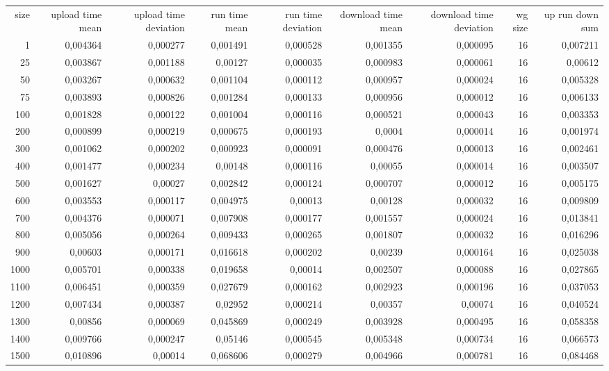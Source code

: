 \begin{tabular}{r r r r r r r r r}
size & upload time mean  & upload time deviation & run time mean & run time deviation & download time mean & download time deviation & wg size & up run down sum \\
1 & 0,004364 & 0,000277 & 0,001491 & 0,000528 & 0,001355 & 0,000095 & 16 & 0,007211 \\
25 & 0,003867 & 0,001188 & 0,00127 & 0,000035 & 0,000983 & 0,000061 & 16 & 0,00612 \\
50 & 0,003267 & 0,000632 & 0,001104 & 0,000112 & 0,000957 & 0,000024 & 16 & 0,005328 \\
75 & 0,003893 & 0,000826 & 0,001284 & 0,000133 & 0,000956 & 0,000012 & 16 & 0,006133 \\
100 & 0,001828 & 0,000122 & 0,001004 & 0,000116 & 0,000521 & 0,000043 & 16 & 0,003353 \\
200 & 0,000899 & 0,000219 & 0,000675 & 0,000193 & 0,0004 & 0,000014 & 16 & 0,001974 \\
300 & 0,001062 & 0,000202 & 0,000923 & 0,000091 & 0,000476 & 0,000013 & 16 & 0,002461 \\
400 & 0,001477 & 0,000234 & 0,00148 & 0,000116 & 0,00055 & 0,000014 & 16 & 0,003507 \\
500 & 0,001627 & 0,00027 & 0,002842 & 0,000124 & 0,000707 & 0,000012 & 16 & 0,005175 \\
600 & 0,003553 & 0,000117 & 0,004975 & 0,00013 & 0,00128 & 0,000032 & 16 & 0,009809 \\
700 & 0,004376 & 0,000071 & 0,007908 & 0,000177 & 0,001557 & 0,000024 & 16 & 0,013841 \\
800 & 0,005056 & 0,000264 & 0,009433 & 0,000265 & 0,001807 & 0,000032 & 16 & 0,016296 \\
900 & 0,00603 & 0,000171 & 0,016618 & 0,000202 & 0,00239 & 0,000164 & 16 & 0,025038 \\
1000 & 0,005701 & 0,000338 & 0,019658 & 0,00014 & 0,002507 & 0,000088 & 16 & 0,027865 \\
1100 & 0,006451 & 0,000359 & 0,027679 & 0,000162 & 0,002923 & 0,000196 & 16 & 0,037053 \\
1200 & 0,007434 & 0,000387 & 0,02952 & 0,000214 & 0,00357 & 0,00074 & 16 & 0,040524 \\
1300 & 0,00856 & 0,000069 & 0,045869 & 0,000249 & 0,003928 & 0,000495 & 16 & 0,058358 \\
1400 & 0,009766 & 0,000247 & 0,05146 & 0,000545 & 0,005348 & 0,000734 & 16 & 0,066573 \\
1500 & 0,010896 & 0,00014 & 0,068606 & 0,000279 & 0,004966 & 0,000781 & 16 & 0,084468 \\

\end{tabular}
